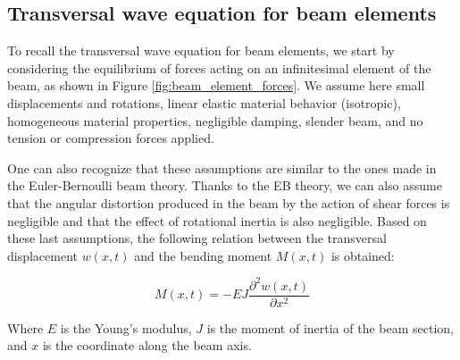 \subsection{Transversal wave equation for beam elements}
\label{subsec:transversal_wave_equation_beam_elements}

To recall the transversal wave equation for beam elements, we start by considering the equilibrium of forces acting on an infinitesimal element of the beam, as shown in Figure \ref{fig:beam_element_forces}.
We assume here small displacements and rotations, linear elastic material behavior (isotropic), homogeneous material properties, negligible damping, slender beam, and no tension or compression forces applied.

One can also recognize that these assumptions are similar to the ones made in the Euler-Bernoulli beam theory.
Thanks to the EB theory, we can also assume that the angular distortion produced in the beam by the action of shear forces is negligible and that the effect of rotational inertia is also negligible.
Based on these last assumptions, the following relation between the transversal displacement $w(x,t)$ and the bending moment $M(x,t)$ is obtained:

\begin{equation}
    M(x,t) = -EJ \frac{\partial^2 w(x,t)}{\partial x^2}
    \label{eq:bending_moment_transversal_displacement}
\end{equation}

Where $E$ is the Young's modulus, $J$ is the moment of inertia of the beam section, and $x$ is the coordinate along the beam axis.

